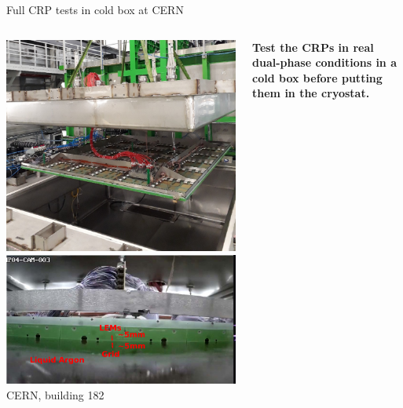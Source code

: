 \documentclass[10pt]{beamer}
\begin{document}
    \begin{frame}{Full CRP tests in cold box at CERN}
   		\begin{columns}
   			\begin{column}{0.4\textwidth}
   				\includegraphics[width=\textwidth]{figures/666/crp_inserting_coldbox.png}\\
   				\includegraphics[width=\textwidth]{figures/666/in_coldbox.png}\\
   				CERN, building 182
    		\end{column}
    		\begin{column}{0.6\textwidth}
    			\begin{scriptsize}
	    			\textbf{Test the CRPs in real dual-phase conditions in a cold box before putting them in the cryostat.}\\
	    			

\end{scriptsize}
\end{column}
\end{columns}
\end{frame}
\end{document}
